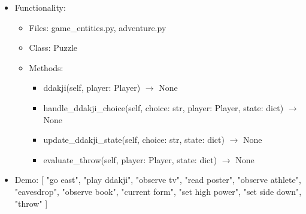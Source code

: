 \documentclass[11pt]{article}
\begin{document}
\begin{enumerate}
\begin{itemize}
       \item Functionality:
        \begin{itemize}
            \item Files: game\_entities.py, adventure.py
            \item Class: Puzzle
            \item Methods:
                \begin{itemize}
                    \item ddakji(self, player: Player) $\rightarrow$ None
                    \item handle\_ddakji\_choice(self, choice: str, player: Player, state: dict) $\rightarrow$ None
                    \item update\_ddakji\_state(self, choice: str, state: dict) $\rightarrow$ None
                    \item evaluate\_throw(self, player: Player, state: dict) $\rightarrow$ None
                 \end{itemize}
        \end{itemize}
       \item Demo: [
        "go east", "play ddakji", "observe tv", "read poster", "observe athlete", "eavesdrop",
        "observe book", "current form", "set high power", "set side down", "throw"
    ]
    \end{itemize}
\end{enumerate}
\end{document}
